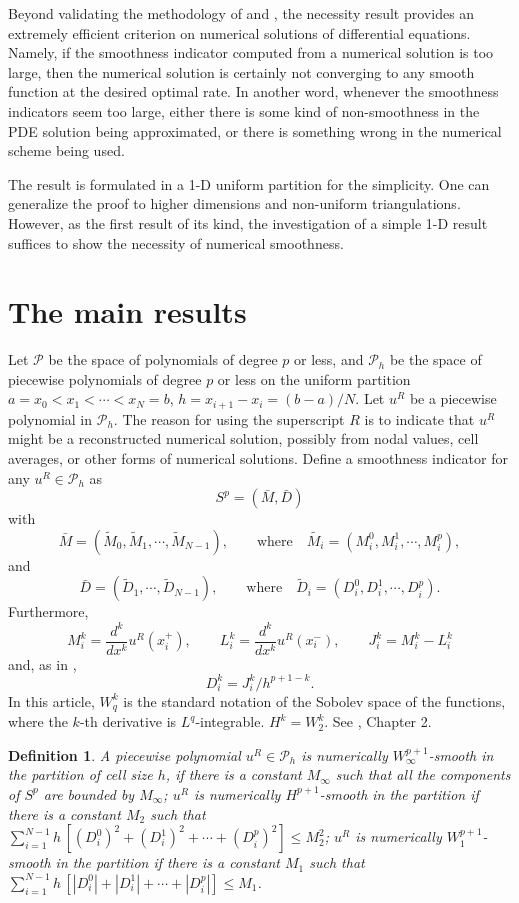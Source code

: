 \documentclass{article}
\newtheorem{definition}[theorem]{Definition}
\numberwithin{equation}{section}
\begin{document}
\begin{spacing}{1.15}
Beyond validating the methodology of \cite{rumsey} and \cite{sun}, the necessity
result provides an extremely efficient criterion on numerical
solutions of differential equations. Namely, if the smoothness
indicator computed from a numerical solution is too large, then the
numerical solution is certainly not converging to any smooth
function at the desired optimal rate. In another word, whenever the
smoothness indicators seem too large, either there is some kind of
non-smoothness in the PDE solution being approximated, or there is
something wrong in the numerical scheme being used.

The result is formulated in a 1-D uniform partition for the simplicity. One
can generalize the proof to higher dimensions and non-uniform triangulations.
However, as the first result of its kind, the investigation of a simple 1-D result suffices to show the necessity of numerical
smoothness.

\section{The main results}

Let ${\mathcal P}$ be the space of polynomials of degree $p$ or less, and ${\mathcal P}_h$ be
the space of piecewise polynomials of degree $p$ or less on the uniform
partition $a=x_0 < x_1 < \cdots < x_N=b$, $h=x_{i+1}-x_i=(b-a)/N$.
Let $u^R$ be a piecewise polynomial in ${\mathcal P}_h$.
The reason for using the superscript $R$ is to indicate that $u^R$ might be a reconstructed
numerical solution, possibly from nodal values, cell averages, or other forms of numerical
solutions. Define a smoothness indicator for any $u^R \in {\mathcal P}_h$ as
$$
S^p = (\bar{M}, \bar{D})
$$
with
$$
\bar{M} = (\tilde{M}_0, \tilde{M}_1, \cdots, \tilde{M}_{N-1}),
\qquad \text{where} \quad \tilde{M_i} = ( M^0_{i}, M^1_{i}, \cdots,
M^p_{i} ),
$$
and
$$
\bar{D} = (\tilde{D}_1, \cdots, \tilde{D}_{N-1}), \qquad
\text{where} \quad \tilde{D}_i = ( D^0_{i}, D^1_{i}, \cdots, D^p_{i}
).
$$
Furthermore,
$$
M_{i}^k = \frac{d^k}{dx^k} u^R(x_i^+), \qquad L_{i}^k =
\frac{d^k}{dx^k} u^R(x_i^-), \qquad J^k_i =  M_{i}^k -  L_{i}^k
$$
and, as in \cite{sun},
$$
D_{i}^k = J_{i}^k / h^{p+1-k}.
$$
In this article, $W^{k}_{q}$ is the standard notation of the Sobolev space of the functions, where
the $k$-th derivative is $L^q$-integrable. $H^k = W^{k}_{2}$. See \cite{brenner}, Chapter 2.

\begin{definition}
A piecewise polynomial $u^R \in {\mathcal P}_h$ is numerically
$W^{p+1}_{\infty}$-smooth in the  partition of cell size $h$, if there is a
constant $M_{\infty}$ such that all the components of $S^p$ are
bounded by $M_{\infty}$; $u^R$ is numerically $H^{p+1}$-smooth in
the partition if there is a constant $M_2$ such that
$\sum_{i=1}^{N-1} h \, [(D^0_i)^2 + (D^1_i)^2 + \cdots + (D^p_i)^2]
\le M_2^2$; $u^R$ is numerically $W^{p+1}_{1}$-smooth in the partition if
there is a constant $M_1$ such that $\sum_{i=1}^{N-1} h \, [|D^0_i|
+ |D^1_i| + \cdots + |D^p_i| ] \le M_1$.
\end{definition}


\end{spacing}
\end{document}
